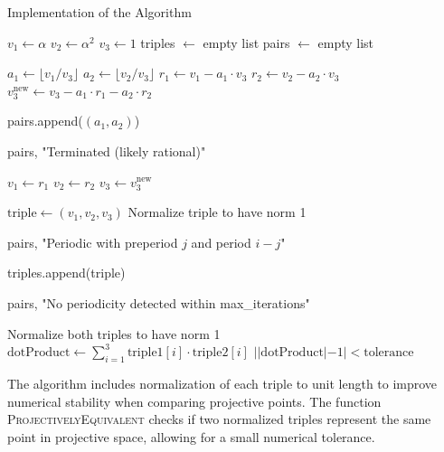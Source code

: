 \begin{algorithm}
\caption{Implementation of the \HAPD{} Algorithm}
\label{alg:hapd_implementation}
\begin{algorithmic}[1]
    \State $v_1 \gets \alpha$
    \State $v_2 \gets \alpha^2$
    \State $v_3 \gets 1$
    \State triples $\gets$ empty list
    \State pairs $\gets$ empty list
    
        \State $a_1 \gets \lfloor v_1/v_3 \rfloor$
        \State $a_2 \gets \lfloor v_2/v_3 \rfloor$
        \State $r_1 \gets v_1 - a_1 \cdot v_3$
        \State $r_2 \gets v_2 - a_2 \cdot v_3$
        \State $v_3^{\text{new}} \gets v_3 - a_1 \cdot r_1 - a_2 \cdot r_2$
        
        \State pairs.append($(a_1, a_2)$)
        
            \State \Return pairs, "Terminated (likely rational)"
        \EndIf
        
        \State $v_1 \gets r_1$
        \State $v_2 \gets r_2$
        \State $v_3 \gets v_3^{\text{new}}$
        
        \State $\text{triple} \gets (v_1, v_2, v_3)$
        \State Normalize triple to have norm 1
        
                \State \Return pairs, "Periodic with preperiod $j$ and period $i-j$"
            \EndIf
        \EndFor
        
        \State triples.append(triple)
    \EndFor
    
    \State \Return pairs, "No periodicity detected within max\_iterations"
\EndProcedure

    \State Normalize both triples to have norm 1
    \State $\text{dotProduct} \gets \sum_{i=1}^3 \text{triple1}[i] \cdot \text{triple2}[i]$
    \State \Return $||\text{dotProduct}| - 1| < \text{tolerance}$
\EndFunction
\end{algorithmic}
\end{algorithm}

\begin{remark}
The algorithm includes normalization of each triple to unit length to improve numerical stability when comparing projective points. The function \textsc{ProjectivelyEquivalent} checks if two normalized triples represent the same point in projective space, allowing for a small numerical tolerance.
\end{remark}

